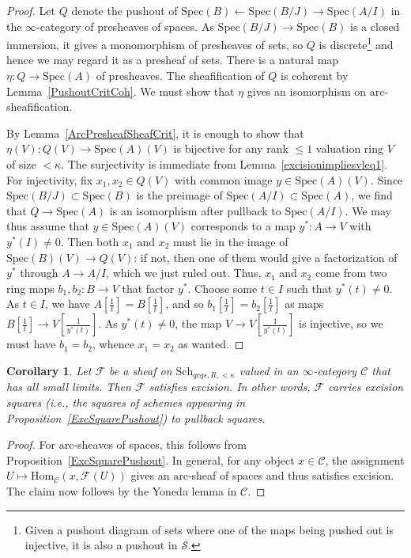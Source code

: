 \documentclass[reqno]{amsart}
\newcommand{\spec}{\mathrm{Spec}}
\newcommand{\arc}{\mathrm{arc}}
\newtheorem{corollary}[theorem]{Corollary}
\theoremstyle{definition}
\begin{document}
\begin{proof}
Let $Q$ denote the pushout of $\spec(B) \gets \spec(B/J) \to \spec(A/I)$ in the
$\infty$-category of presheaves of spaces. As $\spec(B/J) \to \spec(B)$ is a
closed immersion, it gives a monomorphism of presheaves of sets, so $Q$ is
discrete\footnote{Given a pushout diagram of sets where one of the maps being pushed out is injective, it is also a pushout in $\mathcal{S}$.} and hence we may regard it as a presheaf of sets. There is a natural map $\eta\colon Q \to \spec(A)$ of presheaves. The sheafification of $Q$ is coherent by Lemma~\ref{PushoutCritCoh}.  We must show that $\eta$ gives an isomorphism on $\arc$-sheafification. 

By Lemma~\ref{ArcPresheafSheafCrit}, it is  enough to show that $\eta(V)\colon
Q(V) \to \spec(A)(V)$ is bijective for any rank $\leq 1$ valuation ring $V$ of
size $< \kappa$. The surjectivity is immediate from
Lemma~\ref{excisionimpliesvleq1}. For injectivity, fix $x_1,x_2 \in Q(V)$ with
common image  $y \in \spec(A)(V)$. Since $\spec(B/J) \subset \spec(B)$ is the
preimage of $\spec(A/I) \subset \spec(A)$, we find that $Q \to
\spec(A)$ is an isomorphism after pullback to $\spec(A/I)$. We may thus assume
that $y \in \spec(A)(V)$ corresponds to a map $y^*\colon A \to V$ with $y^*(I)
\neq 0$. Then both $x_1$ and $x_2$ must lie in the image of $\spec(B)(V) \to
Q(V)$: if not, then one of them would give a factorization of $y^*$ through $A
\to A/I$, which we just ruled out. Thus, $x_1$ and $x_2$ come from two ring maps
$b_1,b_2\colon B \to V$ that factor $y^*$. Choose some $t \in I$ such that $y^*(t) \neq 0$. As $t  \in I$, we have $A[\frac{1}{t}] = B[\frac{1}{t}]$, and so $b_1[\frac{1}{t}] = b_2[\frac{1}{t}]$ as maps $B[\frac{1}{t}] \to V[\frac{1}{y^*(t)}]$. As $y^*(t) \neq 0$, the map $V \to V[\frac{1}{y^*(t)}]$ is injective, so we must have $b_1 = b_2$, whence $x_1 = x_2$ as wanted.
\end{proof}

\begin{corollary}
\label{ExcArcSheafPull}
Let $\mathcal{F}$ be a sheaf on $\mathrm{Sch}_{qcqs,R, < \kappa}$ valued in an
$\infty$-category $\mathcal{C}$ that has all small limits. Then $\mathcal{F}$ satisfies excision. In other words, $\mathcal{F}$ carries excision squares (i.e., the squares of schemes appearing in Proposition~\ref{ExcSquarePushout}) to pullback squares.
\end{corollary}
\begin{proof}
For $\arc$-sheaves of spaces, this follows from Proposition~\ref{ExcSquarePushout}. In general, for any object $x \in \mathcal{C}$, the assignment $U \mapsto \mathrm{Hom}_{\mathcal{C}}(x, \mathcal{F}(U))$ gives an $\arc$-sheaf of spaces and thus satisfies excision. The claim now follows by the Yoneda lemma in $\mathcal{C}$.
\end{proof}
\end{document}
